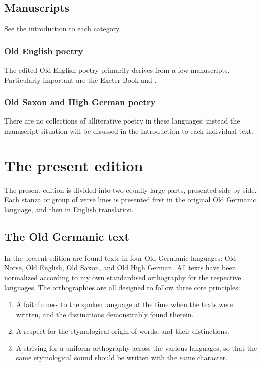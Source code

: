   \subsection{Manuscripts}

    See the introduction to each category.

    \subsubsection{Old English poetry}

    The edited Old English poetry primarily derives from a few manuscripts.  Particularly important are the Exeter Book and \Lacnunga.

    \subsubsection{Old Saxon and High German poetry}

    There are no collections of alliterative poetry in these languages; instead the manuscript situation will be disussed in the Introduction to each individual text.


\section{The present edition}

  The present edition is divided into two equally large parts, presented side by side.  Each stanza or group of verse lines is presented first in the original Old Germanic language, and then in English translation.

  \subsection{The Old Germanic text}

    In the present edition are found texts in four Old Germanic languages: Old Norse, Old English, Old Saxon, and Old High German.  All texts have been normalized according to my own standardised orthography for the respective languages. The orthographies are all designed to follow three core principles:

    \begin{enumerate}
      \item A faithfulness to the spoken language at the time when the texts were written, and the distinctions demonstrably found therein.
      \item A respect for the etymological origin of words, and their distinctions.
      \item A striving for a uniform orthography across the various languages, so that the same etymological sound should be written with the same character.
    \end{enumerate}

